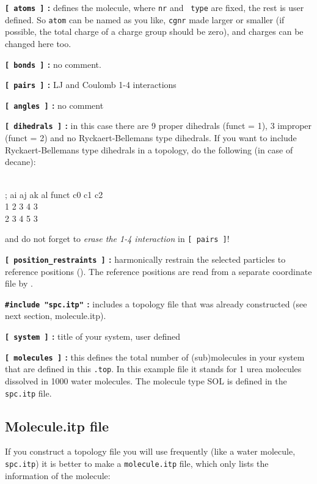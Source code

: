 {\bf {\tt [~atoms~]} :} defines the molecule, where {\tt nr} and {\tt
type} are fixed, the rest is user defined. So {\tt atom} can be named
as you like, {\tt cgnr} made larger or smaller (if possible, the total
charge of a charge group should be zero), and charges can be changed
here too.

{\bf {\tt [~bonds~]} :} no comment.

{\bf {\tt [~pairs~]} :} LJ and Coulomb 1-4 interactions

{\bf {\tt [~angles~]} :} no comment

{\bf {\tt [~dihedrals~]} :} in this case there are 9 proper dihedrals
(funct = 1), 3 improper (funct = 2) and no Ryckaert-Bellemans type
dihedrals. If you want to include Ryckaert-Bellemans type dihedrals
in a topology, do the following (in case of {\eg} decane):
\begin{tt}
[ dihedrals ]\\
;  ai    aj    ak    al funct       c0       c1       c2\\
    1    2     3     4     3 \\
    2    3     4     5     3\\
\end{tt}
and do not forget to {\em erase the 1-4 interaction} 
in {\tt [~pairs~]}!

{\bf {\tt [~position\_restraints~]} :} harmonically restrain the selected particles
to reference positions (). 
The reference positions are read from a 
separate coordinate file by .

{\bf {\tt \#include "spc.itp"} :} includes a topology file that was already
constructed (see next section, molecule.itp).

{\bf {\tt [~system~]} :} title of your system, user defined

{\bf {\tt [~molecules~]} :} this defines the total number of (sub)molecules
in your system that are defined in this {\tt *.top}. In this
example file it stands for 1 urea molecules dissolved in 1000 water
molecules. The molecule type SOL is defined in the {\tt spc.itp} file.

\subsection{Molecule.itp file}
\label{subsec:molitp}
If you construct a topology file you will use frequently (like a water
molecule, {\tt spc.itp}) it is better to make a {\tt molecule.itp}
file, which only lists the information of the molecule: 

